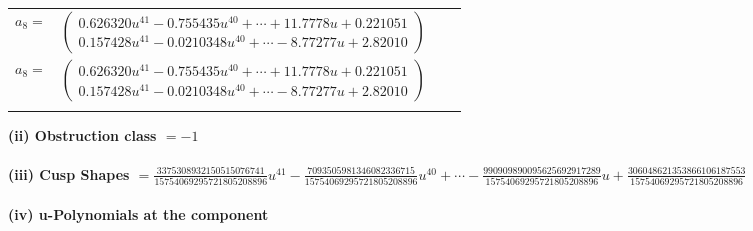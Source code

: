 \documentclass[1p]{elsarticle_modified}
\theoremstyle{definition}
\begin{document}
\begin{tabular}{m{7pt} m{180pt} m{7pt} m{180pt} }
\flushright $a_{8}=$&$\begin{pmatrix}0.626320 u^{41}-0.755435 u^{40}+\cdots+11.7778 u+0.221051\\0.157428 u^{41}-0.0210348 u^{40}+\cdots-8.77277 u+2.82010\end{pmatrix}$\\ \flushright $a_{8}=$&$\begin{pmatrix}0.626320 u^{41}-0.755435 u^{40}+\cdots+11.7778 u+0.221051\\0.157428 u^{41}-0.0210348 u^{40}+\cdots-8.77277 u+2.82010\end{pmatrix}$\\&\end{tabular}
\flushleft \textbf{(ii) Obstruction class $= -1$}\\~\\
\flushleft \textbf{(iii) Cusp Shapes $= \frac{3375308932150515076741}{15754069295721805208896} u^{41}-\frac{7093505981346082336715}{15754069295721805208896} u^{40}+\cdots-\frac{990909890095625692917289}{15754069295721805208896} u+\frac{306048621353866106187553}{15754069295721805208896}$}\\~\\
\newpage\renewcommand{\arraystretch}{1}
\flushleft \textbf{(iv) u-Polynomials at the component}\newline \\
\end{document}

